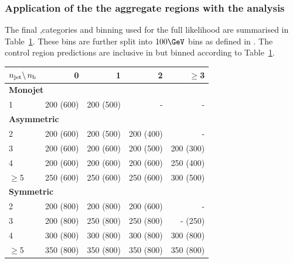 \subsubsection{Application of the the aggregate regions with the \alphat analysis}

The final \nj,\nb categories and \scalht binning used for the full likelihood 
are summarised in Table~\ref{tab:binning}. These bins are further split into
$100 \GeV$ \mht bins as defined in \cite{alphaT}. The control region
predictions are inclusive in \mht but binned according to Table~\ref{tab:binning}.

\begin{table}[htb!]
  \label{tab:binning}
  \centering
  \footnotesize
  \begin{tabular}{ lrrrr }
    \hline
    $n_{\text{jet}} \backslash\, n_{\text{b}}$ & 0         & 1         & 2         & $\geq$3                       \\
    \hline
    \multicolumn{5}{l}{\bf Monojet}                                                              \\
    1                        & 200 (600) & 200 (500) & -     & -                         \\
    \multicolumn{5}{l}{\bf Asymmetric}                                                           \\
    2                        & 200 (600) & 200 (500) & 200 (400) & -                         \\
    3                        & 200 (600) & 200 (600) & 200 (500) & 200 (300)                     \\
    4                        & 200 (600) & 200 (600) & 200 (600) & 250 (400)                     \\
    $\geq$5                  & 250 (600) & 250 (600) & 250 (600) & 300 (500)                     \\
    \multicolumn{5}{l}{\bf Symmetric}                                                            \\
    2                        & 200 (800) & 200 (800) & 200 (600) & -                         \\
    3                        & 200 (800) & 250 (800) & 250 (800) & \phantom{0}-\phantom{0} (250) \\
    4                        & 300 (800) & 300 (800) & 300 (800) & 300 (800)                     \\
    $\geq$5                  & 350 (800) & 350 (800) & 350 (800) & 350 (800)                     \\
    \hline
  \end{tabular}
\end{table}

